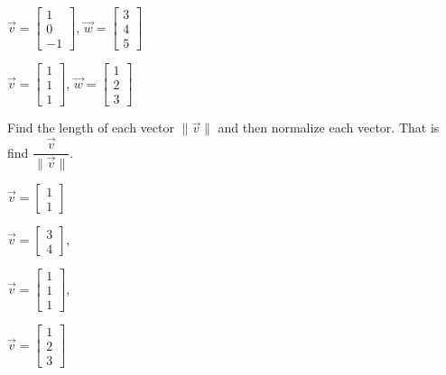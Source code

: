 \begin{exercise}
\begin{inparaenum}[a)]
\item $\vec{v}=\begin{bmatrix}1 \\ 0 \\ -1 \end{bmatrix}$, $\vec{w}=\begin{bmatrix} 3 \\ 4 \\ 5\end{bmatrix}$ \hfill {} 
\item $\vec{v}=\begin{bmatrix}1 \\ 1 \\ 1 \end{bmatrix}$, $\vec{w}=\begin{bmatrix} 1 \\ 2 \\ 3\end{bmatrix}$ \hfill {} \\
\end{inparaenum}
\end{exercise}

\begin{exercise}
Find the length of each vector $\|\vec{v}\|$ and then normalize each vector. That is find $\dfrac{\vec{v}}{\|\vec{v}\|}$.\\
\begin{inparaenum}[a)]
\item $\vec{v}=\begin{bmatrix}1 \\ 1 \end{bmatrix}$ \hfill
\item $\vec{v}=\begin{bmatrix}3 \\ 4 \end{bmatrix}$,  \hfill {} \\
\item $\vec{v}=\begin{bmatrix}1 \\ 1 \\ 1 \end{bmatrix}$, \hfill
\item $\vec{v}=\begin{bmatrix}1\\ 2 \\ 3 \end{bmatrix}$ \hfill {} \\
\end{inparaenum}
\end{exercise}

